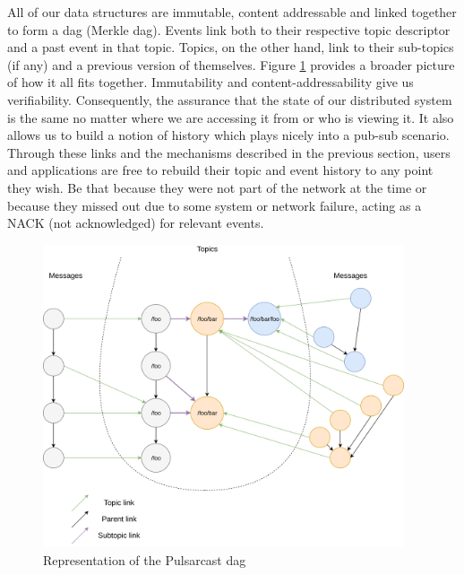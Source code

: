 All of our data structures are immutable, content addressable and linked
together to form a \acrlong{dag} (Merkle \acrshort{dag}). Events link both to
their respective topic descriptor and a past event in that topic. Topics, on
the other hand, link to their sub-topics (if any) and a previous version of
themselves.  Figure \ref{fig:pulsarcast-dag} provides a broader picture of how
it all fits together. Immutability and content-addressability give us
verifiability. Consequently, the assurance that the state of our distributed
system is the same no matter where we are accessing it from or who is viewing
it. It also allows us to build a notion of history which plays nicely into a
pub-sub scenario. Through these links and the mechanisms described in the
previous section, users and applications are free to rebuild their topic and
event history to any point they wish. Be that because they were not part of the
network at the time or because they missed out due to some system or network
failure, acting as a NACK (not acknowledged) for relevant events.

\begin{figure}[hb!]
  \centering
  \includegraphics[width=0.95\textwidth]{img/pulsarcast-dag.png}
  \caption{Representation of the Pulsarcast \acrshort{dag}}
  \label{fig:pulsarcast-dag}
\end{figure}

